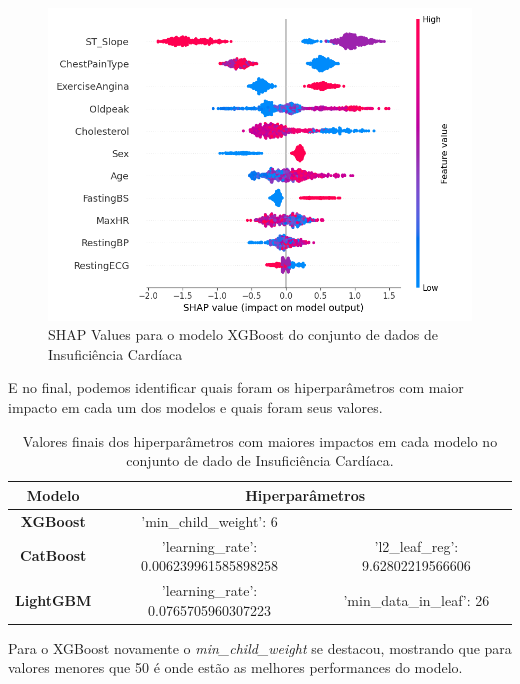 \begin{figure}[H]
 \caption{SHAP Values para o modelo XGBoost do conjunto de dados de Insuficiência Cardíaca}
 \label{shap:fin:car}
 \centering
 \includegraphics[scale=0.5]{images/shap_lgbm_heart.png}
\end{figure}
E no final, podemos identificar quais foram os hiperparâmetros com maior impacto em cada um dos modelos e quais foram seus valores.
\begin{table}[H]
\centering
\begin{tabular}{|c|c|c|}
\hline
\textbf{Modelo} & \multicolumn{2}{c|}{\textbf{Hiperparâmetros}} \\
\hline
\textbf{XGBoost} & 'min\_child\_weight': 6 & \\
\hline
\textbf{CatBoost} &'learning\_rate': 0.006239961585898258 & 'l2\_leaf\_reg': 9.62802219566606 \\
\hline
\textbf{LightGBM} &'learning\_rate': 0.0765705960307223 & 'min\_data\_in\_leaf': 26 \\
\hline
\end{tabular}
\caption{Valores finais dos hiperparâmetros com maiores impactos em cada modelo no conjunto de dado de Insuficiência Cardíaca.}
\end{table}
Para o XGBoost novamente o \textit{min\_child\_weight} se destacou, mostrando que para valores menores que 50 é onde estão as melhores performances do modelo.
